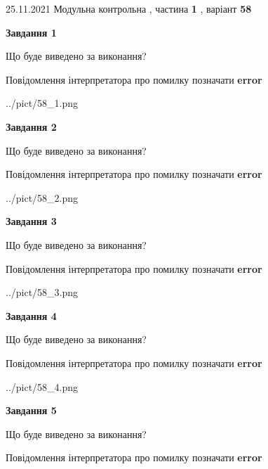 \documentclass[10pt, ukrainian]{article}
\begin{document}
{25.11.2021 Модульна контрольна , частина \textbf { 1 }, варіант  \No \textbf { 58 }\par}
{
\begin {large}

{\begin {center}\textbf{Завдання 1}\end {center}}\par
Що буде виведено за виконання? \par
Повідомлення інтерпретатора про помилку позначати \textbf{error}

\begin{center}
	{../pict/58_1.png}
\end{center}
\newpage

{\begin {center}\textbf{Завдання 2}\end {center}}\par
Що буде виведено за виконання? \par
Повідомлення інтерпретатора про помилку позначати \textbf{error}

\begin{center}
	{../pict/58_2.png}
\end{center}
\newpage

{\begin {center}\textbf{Завдання 3}\end {center}}\par
Що буде виведено за виконання? \par
Повідомлення інтерпретатора про помилку позначати \textbf{error}

\begin{center}
	{../pict/58_3.png}
\end{center}
\newpage

{\begin {center}\textbf{Завдання 4}\end {center}}\par
Що буде виведено за виконання? \par
Повідомлення інтерпретатора про помилку позначати \textbf{error}

\begin{center}
	{../pict/58_4.png}
\end{center}
\newpage

{\begin {center}\textbf{Завдання 5}\end {center}}\par
Що буде виведено за виконання? \par
Повідомлення інтерпретатора про помилку позначати \textbf{error}


\end{large}}
\end{document}
